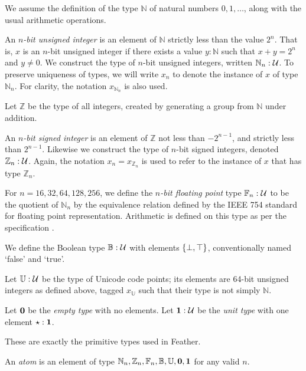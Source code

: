 \documentclass[11pt]{book}
\begin{document}
We assume the definition of the type \( \mathbb N \) of natural numbers \( 0, 1, \dots \), along with the usual arithmetic operations.
\begin{defn}
    An \textit{\( n \)-bit unsigned integer} is an element of \( \mathbb N \) strictly less than the value \( 2^n \).
    That is, \( x \) is an \( n \)-bit unsigned integer if there exists a value \( y : \mathbb N \) such that \( x + y = 2^n \) and \( y \neq 0 \).
    We construct the type of \( n \)-bit unsigned integers, written \( \mathbb N_n : \mathcal{U} \).
    To preserve uniqueness of types, we will write \( x_n \) to denote the instance of \( x \) of type \( \mathbb N_n \).
    For clarity, the notation \( x_{\mathbb N_n} \) is also used.
\end{defn}
Let \( \mathbb Z \) be the type of all integers, created by generating a group from \( \mathbb N \) under addition.
\begin{defn}
    An \textit{\( n \)-bit signed integer} is an element of \( \mathbb Z \) not less than \( -2^{n-1} \), and strictly less than \( 2^{n-1} \).
    Likewise we construct the type of \( n \)-bit signed integers, denoted \( \mathbb Z_n : \mathcal{U} \).
    Again, the notation \( x_n = x_{\mathbb Z_n} \) is used to refer to the instance of \( x \) that has type \( \mathbb Z_n \).
\end{defn}
\begin{defn}
    For \( n = 16, 32, 64, 128, 256 \), we define the \textit{\( n \)-bit floating point} type \( \mathbb F_n : \mathcal{U} \) to be the quotient of \( \mathbb N_n \) by the equivalence relation defined by the IEEE 754 standard for floating point representation.
    Arithmetic is defined on this type as per the specification \cite{IEEE754}.
\end{defn}
\begin{defn}
    We define the Boolean type \( \mathbb B : \mathcal{U} \) with elements \( \qty{\bot, \top} \), conventionally named `false' and `true'.
\end{defn}
\begin{defn}
    Let \( \mathbb U : \mathcal{U} \) be the type of Unicode code points; its elements are 64-bit unsigned integers as defined above, tagged \( x_{\mathbb U} \) such that their type is not simply \( \mathbb N \).
\end{defn}
\begin{defn}
    Let \( \mathbf{0} \) be the \textit{empty type} with no elements.
    Let \( \mathbf{1} : \mathcal{U} \) be the \textit{unit type} with one element \( \star : \mathbf{1} \).
\end{defn}
These are exactly the primitive types used in Feather.
\begin{defn}
    An \textit{atom} is an element of type \( \mathbb N_n, \mathbb Z_n, \mathbb F_n, \mathbb B, \mathbb U, \mathbf{0}, \mathbf{1} \) for any valid \( n \).
\end{defn}
\end{document}
